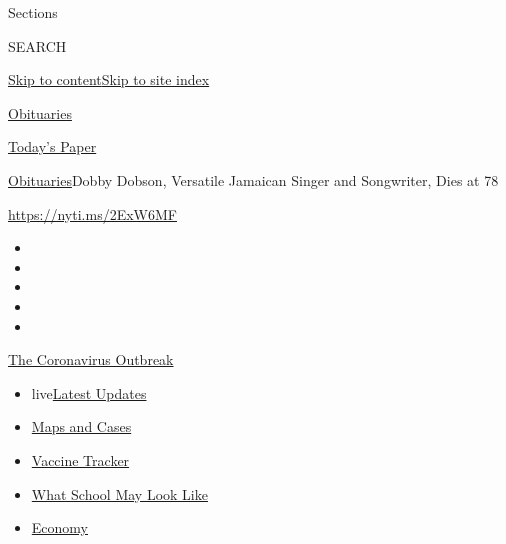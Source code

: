 Sections

SEARCH

\protect\hyperlink{site-content}{Skip to
content}\protect\hyperlink{site-index}{Skip to site index}

\href{https://www.nytimes3xbfgragh.onion/section/obituaries}{Obituaries}

\href{https://myaccount.nytimes3xbfgragh.onion/auth/login?response_type=cookie\&client_id=vi}{}

\href{https://www.nytimes3xbfgragh.onion/section/todayspaper}{Today's
Paper}

\href{/section/obituaries}{Obituaries}\textbar{}Dobby Dobson, Versatile
Jamaican Singer and Songwriter, Dies at 78

\url{https://nyti.ms/2ExW6MF}

\begin{itemize}
\item
\item
\item
\item
\item
\end{itemize}

\href{https://www.nytimes3xbfgragh.onion/news-event/coronavirus?action=click\&pgtype=Article\&state=default\&region=TOP_BANNER\&context=storylines_menu}{The
Coronavirus Outbreak}

\begin{itemize}
\tightlist
\item
  live\href{https://www.nytimes3xbfgragh.onion/2020/08/01/world/coronavirus-covid-19.html?action=click\&pgtype=Article\&state=default\&region=TOP_BANNER\&context=storylines_menu}{Latest
  Updates}
\item
  \href{https://www.nytimes3xbfgragh.onion/interactive/2020/us/coronavirus-us-cases.html?action=click\&pgtype=Article\&state=default\&region=TOP_BANNER\&context=storylines_menu}{Maps
  and Cases}
\item
  \href{https://www.nytimes3xbfgragh.onion/interactive/2020/science/coronavirus-vaccine-tracker.html?action=click\&pgtype=Article\&state=default\&region=TOP_BANNER\&context=storylines_menu}{Vaccine
  Tracker}
\item
  \href{https://www.nytimes3xbfgragh.onion/interactive/2020/07/29/us/schools-reopening-coronavirus.html?action=click\&pgtype=Article\&state=default\&region=TOP_BANNER\&context=storylines_menu}{What
  School May Look Like}
\item
  \href{https://www.nytimes3xbfgragh.onion/live/2020/07/31/business/stock-market-today-coronavirus?action=click\&pgtype=Article\&state=default\&region=TOP_BANNER\&context=storylines_menu}{Economy}
\end{itemize}

